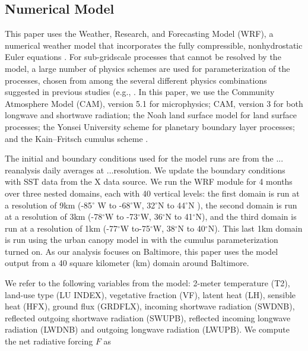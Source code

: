 \documentclass[draft,linenumbers]{agujournal}
\begin{document}
\subsection{Numerical Model}
This paper uses the Weather, Research, and Forecasting Model (WRF), a numerical weather model that incorporates the fully
compressible, nonhydrostatic Euler equations \cite{skamarock2008description}. %
For sub-gridscale processes that cannot be resolved by the model, a large number of physics schemes are 
used for parameterization of the processes, chosen from among the
several different physics combinations suggested in
previous studies (e.g., \cite{argueso2011evaluation, giannakopoulou2012persian, efstathiou2013sensitivity, zittis2014comparison}. %
In this paper, we use the
Community Atmosphere Model (CAM), version 5.1 \citep{neale2010description} %
for microphysics; CAM, version 3 \citep{collins2004description} %
for both longwave and shortwave radiation;
the Noah land surface model \citep{ek2003implementation} %
for land surface processes; 
the Yonsei University scheme \citep{hong2006new} %
for planetary boundary layer processes;
and the Kain–Fritsch cumulus scheme \citep{kain1990one}. %

The initial and boundary conditions
used for the model runs are from the ...
reanalysis daily averages at ...resolution. We update the boundary conditions with SST data from the X data source. 
We run the WRF module for 4 months over three nested domains, each with 40 vertical levels: the first domain is run at a resolution of 9km (-85$^\circ$ W to -68$^\circ$W, 32$^\circ$N to 44$^\circ$N ), the second domain is run at a resolution of 3km (-78$^\circ$W to -73$^\circ$W, 36$^\circ$N to 41$^\circ$N), and the third domain is run at a resolution of 1km (-77$^\circ$W to-75$^\circ$W, 38$^\circ$N to 40$^\circ$N). This last 1km domain is run using the urban canopy model in \cite{chen2011integrated} with the cumulus parameterization turned on. 
As our analysis focuses on Baltimore, this paper uses the model output from a 40 square kilometer (km) domain around Baltimore.

We refer to the following variables from the model: 2-meter temperature (T2),
 land-use type (LU INDEX), vegetative fraction (VF),
 latent heat (LH), 
 sensible heat (HFX), ground flux (GRDFLX), 
incoming shortwave radiation (SWDNB),
reflected outgoing shortwave radiation (SWUPB), 
reflected incoming longwave radiation (LWDNB) and outgoing longwave radiation (LWUPB).  
We compute the net radiative forcing  $F$ as
\end{document}
